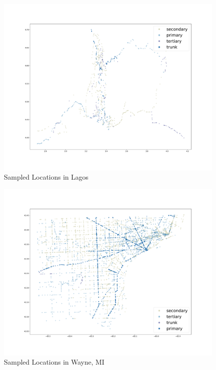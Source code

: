 \documentclass[12pt, letterpaper]{article}
\begin{document}
\begin{figure}
\centering
\caption{Sampled Locations in Lagos}\label{fig:lagos_sample}
\includegraphics[scale=0.5]{../figs/lagos.pdf}
\end{figure}

\begin{figure}
\centering
\caption{Sampled Locations in Wayne, MI}\label{fig:wayne2_sample}
\includegraphics[scale=0.5]{../figs/wayne2.pdf}
\end{figure}

\clearpage
\end{document}
